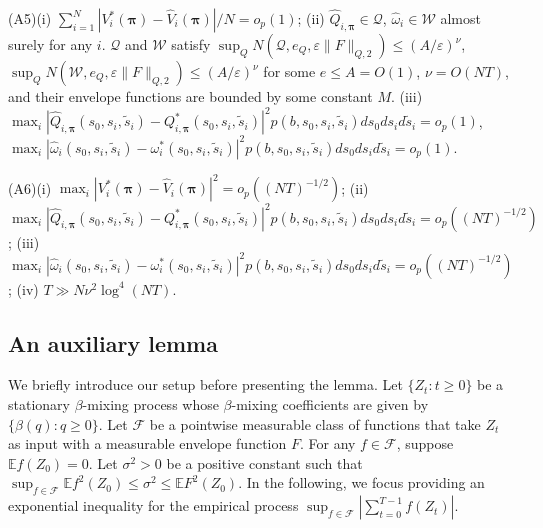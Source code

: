 \documentclass{article}
\newcommand{\Mean}{{\mathbb{E}}}
\begin{document}
(A5)(i) $\sum_{i=1}^N |V_i^*(\bm{\pi})-\widehat{V}_i(\bm{\pi})|/N=o_p(1)$; (ii) $\widehat{Q}_{i,\bm{\pi}}\in \mathcal{Q}$, $\widehat{\omega}_i\in \mathcal{W}$ almost surely for any $i$. $\mathcal{Q}$ and $\mathcal{W}$ satisfy $\sup_Q N(\mathcal{Q}, e_Q, \varepsilon \|F\|_{Q,2})\le (A/\varepsilon)^{\nu}$, $\sup_Q N(\mathcal{W}, e_Q, \varepsilon \|F\|_{Q,2})\le (A/\varepsilon)^{\nu}$ for some $e\le A=O(1)$, $\nu=O(NT)$, and their envelope functions are bounded by some constant $M$. (iii) $\max_i |\widehat{Q}_{i,\bm{\pi}}(s_0,s_i,\widetilde{s}_{i})-Q_{i,\bm{\pi}}^*(s_0,s_i,\widetilde{s}_{i})|^2p(b,s_0,s_i,\tilde{s}_i)ds_0ds_id\tilde{s}_i=o_p(1)$, $\max_i |\widehat{\omega}_i(s_0,s_i,\widetilde{s}_{i})-\omega_{i}^*(s_0,s_i,\widetilde{s}_{i})|^2p(b,s_0,s_i,\tilde{s}_i)ds_0ds_id\tilde{s}_i=o_p(1)$.

(A6)(i) $\max_i |V_i^*(\bm{\pi})-\widehat{V}_i(\bm{\pi})|^2=o_p((NT)^{-1/2} )$; (ii) $\max_i |\widehat{Q}_{i,\bm{\pi}}(s_0,s_i,\widetilde{s}_{i})-Q_{i,\bm{\pi}}^*(s_0,s_i,\widetilde{s}_{i})|^2p(b,s_0,s_i,\tilde{s}_i)ds_0ds_id\tilde{s}_i=o_p((NT)^{-1/2})$; (iii) $\max_i |\widehat{\omega}_i(s_0,s_i,\widetilde{s}_{i})-\omega_{i}^*(s_0,s_i,\widetilde{s}_{i})|^2p(b,s_0,s_i,\tilde{s}_i)ds_0ds_id\tilde{s}_i=o_p((NT)^{-1/2})$; (iv) $T\gg N\nu^2 \log^4 (NT)$.
  
\subsection{An auxiliary lemma}
We briefly introduce our setup before presenting the lemma.
Let $\{Z_t:t\ge 0\}$ be a stationary $\beta$-mixing process whose $\beta$-mixing coefficients are given by $\{\beta(q):q\ge 0\}$. %
Let $\mathcal{F}$ be a pointwise measurable class of functions that take $Z_t$ as input with a measurable envelope function $F$. For any $f\in \mathcal{F}$, suppose $\Mean f(Z_0)=0$. Let $\sigma^2>0$ be a positive constant such that $\sup_{f\in \mathcal{F}} \Mean f^2(Z_0)\le \sigma^2 \le \Mean F^2(Z_0)$. In the following, we focus providing an exponential inequality for the empirical process $\sup_{f\in \mathcal{F}}|\sum_{t=0}^{T-1} f(Z_t)|$. 
\end{document}
